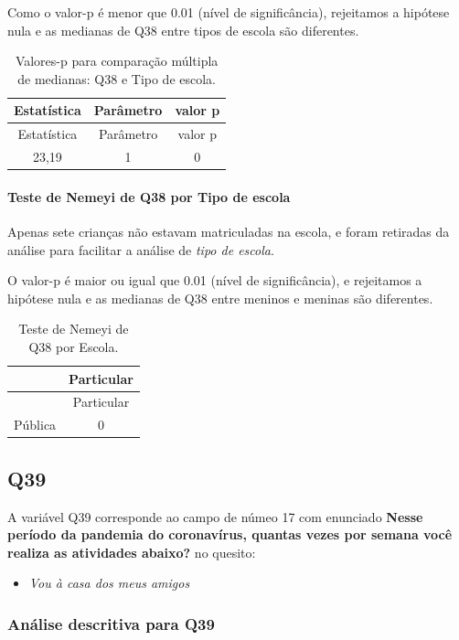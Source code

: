 \documentclass[]{article}
\providecommand{\tightlist}{%
  \setlength{\itemsep}{0pt}\setlength{\parskip}{0pt}}
\let\oldparagraph\paragraph
\renewcommand{\paragraph}[1]{\oldparagraph{#1}\mbox{}}
\begin{document}
Como o valor-p é menor que 0.01 (nível de significância), rejeitamos a hipótese nula e as medianas de Q38 entre tipos de escola são diferentes.

\begin{longtable}[]{@{}ccc@{}}
\caption{\label{tab:unnamed-chunk-1475}Valores-p para comparação múltipla de medianas: Q38 e Tipo de escola.}\tabularnewline
\toprule
Estatística & Parâmetro & valor p\tabularnewline
\midrule
\endfirsthead
\toprule
Estatística & Parâmetro & valor p\tabularnewline
\midrule
\endhead
23,19 & 1 & 0\tabularnewline
\bottomrule
\end{longtable}

\hypertarget{teste-de-nemeyi-de-q38-por-tipo-de-escola}{%
\paragraph{Teste de Nemeyi de Q38 por Tipo de escola}\label{teste-de-nemeyi-de-q38-por-tipo-de-escola}}

Apenas sete crianças não estavam matriculadas na escola, e foram retiradas da análise para facilitar a análise de \emph{tipo de escola}.

O valor-p é maior ou igual que 0.01 (nível de significância), e rejeitamos a hipótese nula e as medianas de Q38 entre meninos e meninas são diferentes.

\begin{longtable}[]{@{}lc@{}}
\caption{\label{tab:unnamed-chunk-1477}Teste de Nemeyi de Q38 por Escola.}\tabularnewline
\toprule
& Particular\tabularnewline
\midrule
\endfirsthead
\toprule
& Particular\tabularnewline
\midrule
\endhead
Pública & 0\tabularnewline
\bottomrule
\end{longtable}

\cleardoublepage

\hypertarget{q39}{%
\subsection{Q39}\label{q39}}

A variável Q39 corresponde ao campo de númeo 17 com enunciado \textbf{Nesse período da pandemia do coronavírus, quantas vezes por semana você realiza as atividades abaixo?} no quesito:

\begin{itemize}
\tightlist
\item
  \emph{Vou à casa dos meus amigos}
\end{itemize}

\hypertarget{anuxe1lise-descritiva-para-q39}{%
\subsubsection{Análise descritiva para Q39}\label{anuxe1lise-descritiva-para-q39}}
\end{document}
